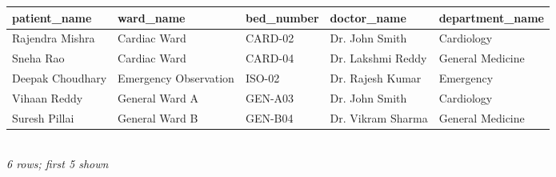 {\scriptsize\setlength{\tabcolsep}{2.5pt}\begin{tabular}{lllll}\toprule
\textbf{patient\_name} & \textbf{ward\_name} & \textbf{bed\_number} & \textbf{doctor\_name} & \textbf{department\_name} \\\midrule
Rajendra Mishra & Cardiac Ward & CARD-02 & Dr. John Smith & Cardiology \\
Sneha Rao & Cardiac Ward & CARD-04 & Dr. Lakshmi Reddy & General Medicine \\
Deepak Choudhary & Emergency Observation & ISO-02 & Dr. Rajesh Kumar & Emergency \\
Vihaan Reddy & General Ward A & GEN-A03 & Dr. John Smith & Cardiology \\
Suresh Pillai & General Ward B & GEN-B04 & Dr. Vikram Sharma & General Medicine \\
\bottomrule\end{tabular}}\\[-1pt]{\tiny\itshape 6 rows; first 5 shown}
